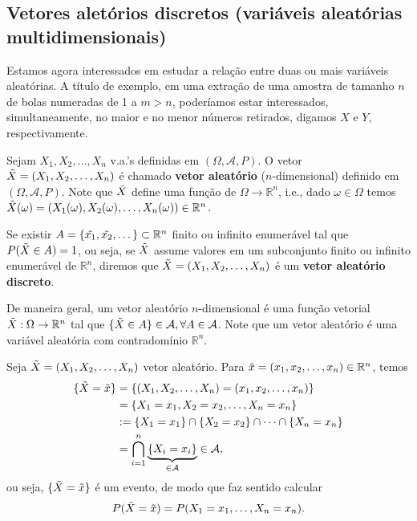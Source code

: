 \documentclass[../Notas.tex]{subfiles}
\begin{document}

\subsection{Vetores aletórios discretos (variáveis aleatórias multidimensionais)}
Estamos agora interessados em estudar a relação entre duas ou mais variáveis aleatórias. A título de exemplo, em uma extração de uma amostra de tamanho $n$ de bolas numeradas de 1 a $m > n$, poderíamos estar interessados, simultaneamente, no maior e no menor números retirados, digamos $X$ e $Y$, respectivamente.

\begin{definition}
Sejam $X_1, X_2, \dots, X_n$ v.a.'s definidas em $(\Omega, \mathcal{A}, P)$. O vetor $\Tilde{X} = (X_1, X_2, \dots, X_n)$ é chamado \textbf{vetor aleatório} ($n$-dimensional) definido em $(\Omega, \mathcal{A}, P)$. Note que $\Tilde{X}$ define uma função de $\Omega\to\mathbb{R}^n$, i.e., dado $\omega\in\Omega$ temos $\Tilde{X}(\omega) = (X_1(\omega), X_2(\omega), \dots, X_n(\omega))\in\mathbb{R}^n$. 
\end{definition}

\begin{remark}
Se existir $A = \{ \Tilde{x_1}, \Tilde{x_2}, \dots \}\subset\mathbb{R}^n$ finito ou infinito enumerável tal que $P(\Tilde{X}\in A) = 1$, ou seja, se $\Tilde{X}$ assume valores em um subconjunto finito ou infinito enumerável de $\mathbb{R}^n$, diremos que $\Tilde{X} = (X_1, X_2, \dots, X_n)$ é um \textbf{vetor aleatório discreto}.
\end{remark}

De maneira geral, um vetor aleatório $n$-dimensional é uma função vetorial $\Tilde{X}:\Omega\to\mathbb{R}^n$ tal que $\{ \Tilde{X}\in A \}\in\mathcal{A}, \forall A\in\mathcal{A}$. Note que um vetor aleatório é uma variável aleatória com contradomínio $\mathbb{R}^n$.

\begin{remark}
Seja $\Tilde{X} = (X_1, X_2, \dots, X_n)$ vetor aleatório. Para $\Tilde{x} = (x_1, x_2, \dots, x_n)\in\mathbb{R}^n$, temos
\begin{align*}
    \{ \Tilde{X} = \Tilde{x} \} &= \{ (X_1, X_2, \dots, X_n) = (x_1, x_2, \dots, x_n) \} \\
    &= \{ X_1 = x_1, X_2 = x_2, \dots, X_n = x_n \} \\
    &:= \{ X_1=x_1 \}\cap\{X_2=x_2\}\cap\cdots\cap\{X_n=x_n\} \\
    &= \bigcap_{i=1}^{n}\underbrace{\{ X_i = x_i \}}_{\in\mathcal{A}}\in\mathcal{A},
\end{align*}
ou seja, $\{ \Tilde{X} = \Tilde{x} \}$ é um evento, de modo que faz sentido calcular
\begin{align*}
    P(\Tilde{X} = \Tilde{x}) = P(X_1=x_1, \dots, X_n=x_n).
\end{align*}
\end{remark}
\end{document}
